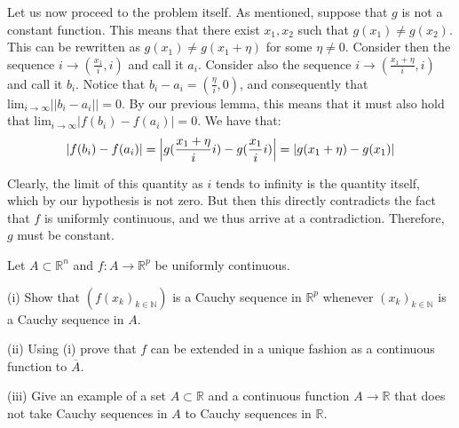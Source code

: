 \begin{solution}
    Let us now proceed to the problem itself. As mentioned, suppose that $g$ is not a constant function. This means that there exist $x_1, x_2$ such that $g(x_1) \neq g(x_2)$. This can be rewritten as $g(x_1) \neq g(x_1+\eta)$ for some $\eta \neq 0$. Consider then the sequence $i \rightarrow (\frac{x_1}{i}, i)$ and call it $a_i$. Consider also the sequence $i \rightarrow (\frac{x_1+\eta}{i}, i)$ and call it $b_i$. Notice that $b_i - a_i = (\frac{\eta}{i}, 0)$, and consequently that $\text{lim}_{i \rightarrow \infty} \lvert \lvert b_i - a_i \rvert \rvert = 0$. By our previous lemma, this means that it must also hold that $\text{lim}_{i \rightarrow \infty}\lvert f(b_i) - f(a_i) \rvert = 0$. We have that:
    $$\lvert f(b_i) - f(a_i) \rvert = \Bigl\lvert g(\frac{x_1+\eta}{i}i) - g(\frac{x_1}{i}i) \Bigr\rvert = \lvert g(x_1 + \eta) - g(x_1) \rvert$$

    Clearly, the limit of this quantity as $i$ tends to infinity is the quantity itself, which by our hypothesis is not zero. But then this directly contradicts the fact that $f$ is uniformly continuous, and we thus arrive at a contradiction. Therefore, $g$ must be constant.
\end{solution}

\begin{exercise}{33}
    Let $A \subset \mathbb{R}^n$ and $f: A \rightarrow \mathbb{R}^p$ be uniformly continuous.

    (i) Show that $(f(x_k)_{k \in \mathbb{N}})$ is a Cauchy sequence in $\mathbb{R}^p$ whenever $(x_k)_{k \in \mathbb{N}}$ is a Cauchy sequence in $A$.

    (ii) Using (i) prove that $f$ can be extended in a unique fashion as a continuous function to $\overline{A}$.

    (iii) Give an example of a set $A \subset \mathbb{R}$ and a continuous function $A \rightarrow \mathbb{R}$ that does not take Cauchy sequences in $A$ to Cauchy sequences in $\mathbb{R}$.
\end{exercise}

